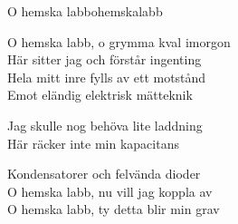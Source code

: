 \begin{song}{O hemska labb}{ohemskalabb}
\begin{vers}
O hemska labb, o grymma kval imorgon\\
Här sitter jag och förstår ingenting\\
Hela mitt inre fylls av ett motstånd\\
Emot eländig elektrisk mätteknik\\
\end{vers}
\begin{vers}
Jag skulle nog behöva lite laddning\\
Här räcker inte min kapacitans\\
\end{vers}
\begin{vers}
Kondensatorer och felvända dioder\\
O hemska labb, nu vill jag koppla av\\
O hemska labb, ty detta blir min grav\\
\end{vers}
\end{song}